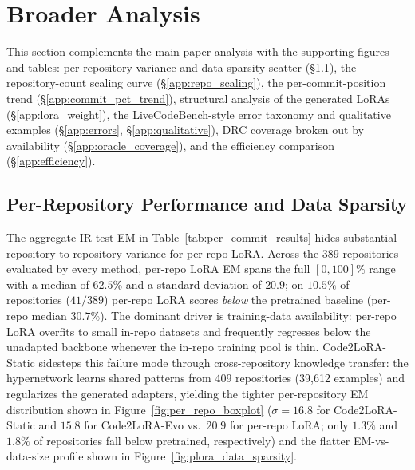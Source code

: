 \documentclass{llmxive}
\providecommand{\codelora}{Code2LoRA\xspace}
\providecommand{\codelorastatic}{\codelora-Static\xspace}
\providecommand{\codeloraevo}{\codelora-Evo\xspace}
\begin{document}
\section{Broader Analysis}
\label{app:analysis}

This section complements the main-paper analysis with the supporting figures and tables:
per-repository variance and data-sparsity scatter (\S\ref{app:per_repo_variance}),
the repository-count scaling curve (\S\ref{app:repo_scaling}),
the per-commit-position trend (\S\ref{app:commit_pct_trend}),
structural analysis of the generated LoRAs (\S\ref{app:lora_weight}),
the LiveCodeBench-style error taxonomy and qualitative examples (\S\ref{app:errors}, \S\ref{app:qualitative}),
DRC coverage broken out by availability (\S\ref{app:oracle_coverage}),
and the efficiency comparison (\S\ref{app:efficiency}).

\subsection{Per-Repository Performance and Data Sparsity}
\label{app:per_repo_variance}

The aggregate IR-test EM in Table~\ref{tab:per_commit_results} hides substantial repository-to-repository variance for per-repo LoRA.
Across the $389$ repositories evaluated by every method, per-repo LoRA EM spans the full $[0, 100]\%$ range with a median of $62.5\%$ and a standard deviation of $20.9$; on $10.5\%$ of repositories ($41 / 389$) per-repo LoRA scores \emph{below} the pretrained baseline (per-repo median $30.7\%$).
The dominant driver is training-data availability: per-repo LoRA overfits to small in-repo datasets and frequently regresses below the unadapted backbone whenever the in-repo training pool is thin.
\codelorastatic{} sidesteps this failure mode through cross-repository knowledge transfer: the hypernetwork learns shared patterns from 409 repositories (39{,}612 examples) and regularizes the generated adapters, yielding the tighter per-repository EM distribution shown in Figure~\ref{fig:per_repo_boxplot} ($\sigma{=}16.8$ for \codelorastatic{} and $15.8$ for \codeloraevo{} vs.\ $20.9$ for per-repo LoRA; only $1.3\%$ and $1.8\%$ of repositories fall below pretrained, respectively) and the flatter EM-vs-data-size profile shown in Figure~\ref{fig:plora_data_sparsity}.
\end{document}

